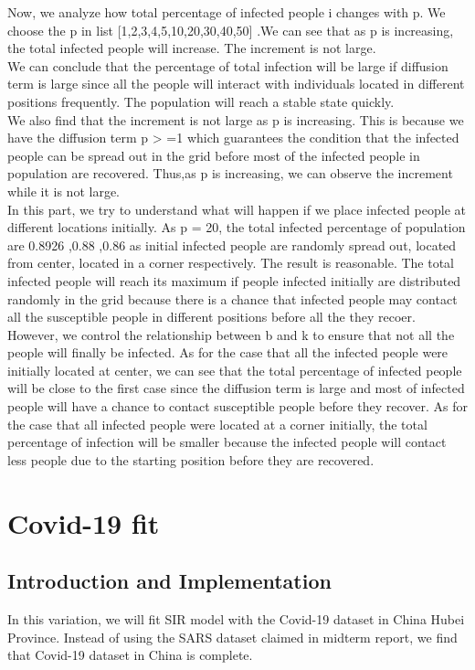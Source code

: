 \documentclass{article}
\begin{document}
Now, we analyze how total percentage of infected people i changes with p. We choose the p in list [1,2,3,4,5,10,20,30,40,50] .We can see that as p is increasing, the total infected people will increase. The increment is not large.\\
 We can conclude that the percentage of total infection will be large if diffusion term is large since all the people will interact with individuals located in different positions frequently. The population will reach a stable state quickly. \\
 We also find that the increment is not large as p is increasing. This is because we have the diffusion term p > =1 which guarantees the condition that the infected people can be spread out in the grid before most of the infected people in population are recovered.
 Thus,as p is increasing, we can observe the increment while it is not large.\\

 In this part, we try to understand what will happen if we place infected people at different locations initially. As p = 20, the total infected percentage of population are 0.8926 ,0.88 ,0.86 as initial infected people are randomly spread out, located from center, located in a corner respectively. The result is reasonable. The total infected people will reach its maximum if people infected initially are distributed randomly in the grid because there is a chance that infected people may contact all the susceptible people in different positions before all the they recoer. However, we control the relationship between b and k to ensure that not all the people will finally be infected.
 As for the case that all the infected people were initially located at center, we can see that the total percentage of infected people will be close to the first case since the diffusion term is large  and most of infected people will have a chance to contact susceptible people before they recover. As for the case that all infected people were located at a corner initially, the total percentage of infection will be smaller because the infected people will contact less people due to the starting position before they are recovered.


 \section{Covid-19 fit}
\subsection{Introduction and Implementation}
In this variation, we will fit SIR model with the Covid-19 dataset in China Hubei Province. Instead of using the SARS dataset claimed in midterm report, we find that Covid-19 dataset in China is complete. \\
\end{document}
